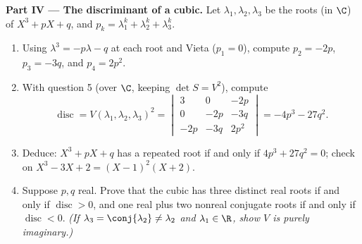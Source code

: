 \begin{problem}
\medskip
\noindent\textbf{Part IV --- The discriminant of a cubic.} Let
$\lambda_1, \lambda_2, \lambda_3$ be the roots (in $\C$) of $X^3
+ pX + q$, and $p_k = \lambda_1^k + \lambda_2^k + \lambda_3^k$.
\begin{enumerate}[resume]
  \item Using $\lambda^3 = -p\lambda - q$ at each root and
        Vieta ($p_1 = 0$), compute $p_2 = -2p$, $p_3 = -3q$, and
        $p_4 = 2p^2$.
  \item With question 5 (over $\C$, keeping $\det S = V^2$),
        compute
        \[
        \operatorname{disc} = V(\lambda_1, \lambda_2,
        \lambda_3)^2 = \begin{vmatrix}
        3 & 0 & -2p\\
        0 & -2p & -3q\\
        -2p & -3q & 2p^2
        \end{vmatrix}
        = -4p^3 - 27q^2 .
        \]
  \item Deduce: $X^3 + pX + q$ has a repeated root if and only
        if $4p^3 + 27q^2 = 0$; check on $X^3 - 3X + 2 = (X -
        1)^2(X + 2)$.
  \item Suppose $p, q$ real. Prove that the cubic has three
        distinct real roots if and only if $\operatorname{disc}
        > 0$, and one real plus two nonreal conjugate roots if
        and only if $\operatorname{disc} < 0$. \emph{(If
        $\lambda_3 = \conj{\lambda_2} \neq \lambda_2$ and
        $\lambda_1 \in \R$, show $V$ is purely imaginary.)}
\end{enumerate}


\end{problem}
